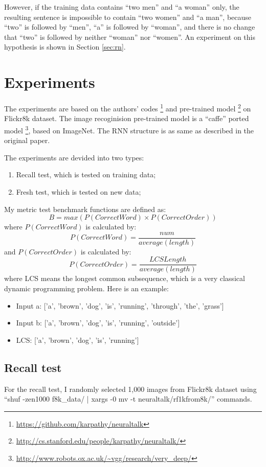 \documentclass[10pt,twocolumn,letterpaper]{article}
\begin{document}
However, if the training data contains ``two men'' and ``a woman'' only,
the resulting sentence is impossible to contain ``two women'' and ``a man'',
because ``two'' is followed by ``men'', ``a'' is followed by ``woman'',
and there is no change that ``two'' is followed by neither ``woman'' nor ``women''.
An experiment on this hypothesis is shown in Section \ref{sec:rn}.


\section{Experiments}
The experiments are based on the authors' codes \footnote{\url{https://github.com/karpathy/neuraltalk}} and pre-trained model
\footnote{\url{http://cs.stanford.edu/people/karpathy/neuraltalk/}} on Flickr8k dataset.
The image recoginision pre-trained model is a ``caffe'' ported model \footnote{\url{http://www.robots.ox.ac.uk/~vgg/research/very_deep/}}, based on ImageNet.
The RNN structure is as same as described in the original paper.

The experiments are devided into two types:
\begin{enumerate}
    \item Recall test, which is tested on training data;
    \item Fresh test, which is tested on new data;
\end{enumerate}

My metric test benchmark functions are defined as:
$$B = max(P(CorrectWord) \times P(CorrectOrder))$$
where $P(CorrectWord)$ is calculated by:
$$P(CorrectWord) = \frac{num}{average(length)}$$
and $P(CorrectOrder)$ is calculated by:
$$P(CorrectOrder) = \frac{LCSLength}{average(length)}$$
where LCS means the longest common subsequence, which is a very classical dynamic programming problem.
Here is an example:
\begin{itemize}
    \item Input a: ['a', 'brown', 'dog', 'is', 'running', 'through', 'the', 'grass']
    \item Input b: ['a', 'brown', 'dog', 'is', 'running', 'outside']
    \item LCS: ['a', 'brown', 'dog', 'is', 'running']
\end{itemize}

\subsection{Recall test}
For the recall test, I randomly selected 1,000 images from Flickr8k dataset using
``shuf -zen1000 f8k\_data/\text{*} | xargs -0 mv -t neuraltalk/rf1kfrom8k/'' commands.
\end{document}
